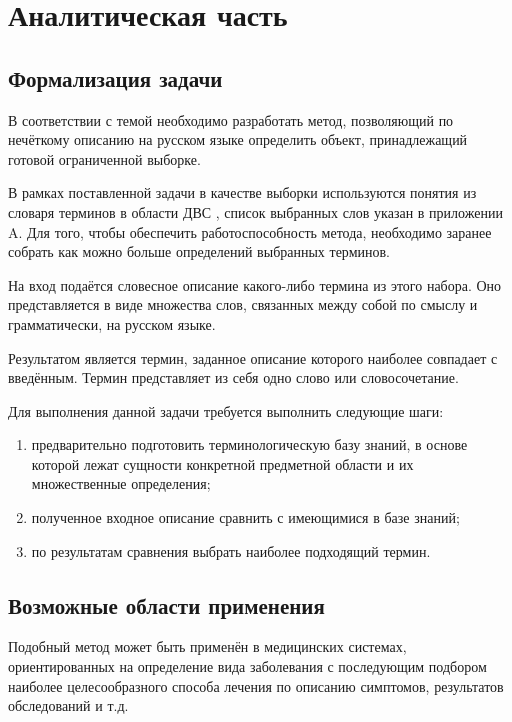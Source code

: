\section{Аналитическая часть}

\subsection{Формализация задачи}
В соответствии с темой необходимо разработать метод, позволяющий по нечёткому описанию на русском языке определить объект, принадлежащий готовой ограниченной выборке. 

В рамках поставленной задачи в качестве выборки используются понятия из словаря терминов в области ДВС \cite{ICE}, список выбранных слов указан в приложении A. Для того, чтобы обеспечить работоспособность метода, необходимо заранее собрать как можно больше определений выбранных терминов.

На вход подаётся словесное описание какого-либо термина из этого набора. Оно представляется в виде множества слов, связанных между собой по смыслу и грамматически, на русском языке. 

Результатом является термин, заданное описание которого наиболее совпадает с введённым. Термин представляет из себя одно слово или словосочетание. 

Для выполнения данной задачи требуется выполнить следующие шаги:
\begin{enumerate}
	\item предварительно подготовить терминологическую базу знаний, в основе которой лежат сущности конкретной предметной области и их множественные определения;
	
	\item полученное входное описание сравнить с имеющимися в базе знаний;
	
	\item по результатам сравнения выбрать наиболее подходящий термин. \newline
\end{enumerate}

\subsection{Возможные области применения}
Подобный метод может быть применён в медицинских системах, ориентированных на определение вида заболевания с последующим подбором наиболее целесообразного способа лечения по описанию симптомов, результатов обследований и т.д. 

